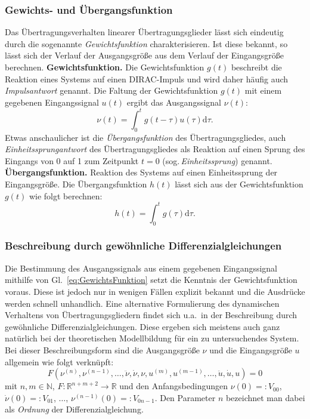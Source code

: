 \subsubsection{Gewichts- und Übergangsfunktion}\label{sec:gewichts-und-uberg}
Das Übertragungsverhalten linearer Übertragungsglieder lässt sich eindeutig durch die sogenannte \emph{Gewichtsfunktion} charakterisieren. Ist diese bekannt, so lässt sich der Verlauf der Ausgangsgröße aus dem Verlauf der Eingangsgröße berechnen.
\textbf{Gewichtsfunktion.} Die Gewichtsfunktion $g(t)$ beschreibt die Reaktion eines Systems auf einen DIRAC-Impuls und wird daher häufig auch \emph{Impulsantwort} genannt.
Die Faltung der Gewichtsfunktion $g(t)$ mit einem gegebenen Eingangssignal $u(t)$ ergibt das Ausgangssignal $\nu(t)$:
\begin{equation} \label{eq:GewichtsFunktion}
  \nu(t) = \int_0^t g(t-\tau)u(\tau)\mathrm{d}\tau.
\end{equation}
Etwas anschaulicher ist die \emph{Übergangsfunktion} des Übertragungsgliedes, auch \emph{Einheitssprungantwort} des Übertragungsgliedes als Reaktion auf einen Sprung des Eingangs von 0 auf 1 zum Zeitpunkt $t = 0$ (sog.\,\emph{Einheitssprung}) genannt.
\textbf{Übergangsfunktion.} Reaktion des Systems auf einen Einheitssprung der Eingangsgröße.
Die Übergangsfunktion $h(t)$ lässt sich aus der Gewichtsfunktion $g(t)$ wie folgt berechnen:
\begin{equation} \label{eq:Uebergangsfunktion}
  h(t) = \int_0^t g(\tau) \mathrm{d}\tau.
\end{equation}

\subsubsection{Beschreibung durch gewöhnliche Differenzialgleichungen} \label{sec:beschr-durch-gewohnl}
Die Bestimmung des Ausgangssignals aus einem gegebenen Eingangssignal mithilfe von Gl.~\eqref{eq:GewichtsFunktion} setzt die Kenntnis der Gewichtsfunktion voraus. Diese ist jedoch nur in wenigen Fällen explizit bekannt und die Ausdrücke werden schnell unhandlich.
Eine alternative Formulierung des dynamischen Verhaltens von Übertragungsgliedern findet sich u.a.~in der Beschreibung durch gewöhnliche Differenzialgleichungen. Diese ergeben sich meistens auch ganz natürlich bei der theoretischen Modellbildung für ein zu untersuchendes System.
Bei dieser Beschreibungsform sind die Ausgangsgröße $\nu$ und die Eingangsgröße $u$ allgemein wie folgt verknüpft:
\begin{equation} \label{eq:DlgAllgemein}
  F(\nu^{(n)}, \nu^{(n-1)}, \ldots, \ddot \nu, \dot \nu, \nu, u^{(m)}, u^{(m-1)}, \ldots, \ddot u, \dot u, u) = 0
\end{equation}
mit $n, m \in \mathbb{N}$, $F : \mathbb{R}^{n+m+2} \to \mathbb{R}$ und den Anfangsbedingungen $\nu(0) =: V_{00}$, $\dot \nu(0) =: V_{01}$, $\ldots$, $\nu^{(n-1)}(0) =: V_{0n-1}$. Den Parameter $n$ bezeichnet man dabei als \emph{Ordnung} der Differenzialgleichung.

